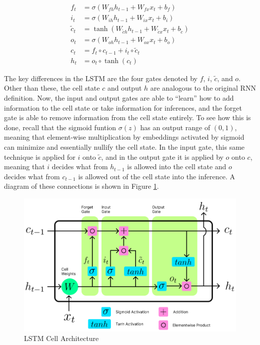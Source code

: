 \documentclass{scrartcl}
\begin{document}
\newcommand{\csquig}{\tilde{c}}

\begin{equation}
	\begin{split}
		f_t           & = \sigma ( W_{fh} h_{t - 1} + W_{fx} x_t + b_f ) \\
		i_t           & = \sigma ( W_{ih} h_{t - 1} + W_{ix} x_t + b_i ) \\
		\csquig_t     & = \tanh ( W_{\csquig h} h_{t - 1} + W_{\csquig x} x_t + b_{\csquig} ) \\
		o_t           & = \sigma ( W_{oh} h_{t - 1} + W_{ox} x_t + b_o ) \\
		c_t           & = f_t \circ c_{t - 1} + i_t \circ \tilde{c}_t \\
		h_t           & = o_t \circ \tanh ( c_t )
	\end{split}
	\label{eq:lstm_canonical}
\end{equation}

The key differences in the LSTM are the four gates denoted by $f$, $i$,
$\tilde{c}$, and $o$. Other than these, the cell state $c$ and output $h$ are
analogous to the original RNN definition. Now, the input and output gates are
able to ``learn'' how to add information to the cell state or take information
for inferences, and the forget gate is able to remove information from the cell
state entirely. To see how this is done, recall that the sigmoid funtion
$\sigma (z)$ has an output range of $(0, 1)$, meaning that element-wise
multiplication by embeddings activated by sigmoid can minimize and essentially
nullify the cell state. In the input gate, this same technique is applied for
$i$ onto $\tilde{c}$, and in the output gate it is applied by $o$ onto $c$,
meaning that $i$ decides what from $h_{t - 1}$ is allowed into the cell state
and $o$ decides what from $c_{t - 1}$ is allowed out of the cell state into the
inference. A diagram of these connections is shown in Figure
\ref{fig:lstmcell_arch}.

\begin{figure}[H]
	\begin{center}
		\includegraphics[width=1\textwidth]{figures/lstmcell_arch.png}
	\end{center}
	\caption{LSTM Cell Architecture}
	\label{fig:lstmcell_arch}
\end{figure}
\end{document}
